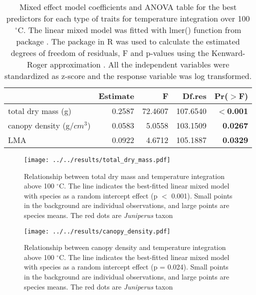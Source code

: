 \documentclass[12pt]{report}
\begin{document}


\begin{table}
\centering
\caption{Mixed effect model coefficients and ANOVA table for the best predictors for each type of traits for temperature integration over 100 $^{\circ}$C. The linear mixed model was fitted with lmer() function from  package \citep{bates2009package}. The  package in R \citep{fox2013hypothesis} was used to calculate the estimated degrees of freedom of residuals, F and p-values using the Kenward-Roger approximation \citep{kenward1997small}. All the independent variables were standardized  as z-score and the response variable was log transformed.}
\vspace{0.5 cm}
\begin{tabular}{lrrrr}
  \hline
 &  Estimate & F  & Df.res & Pr($>$F) \\ 
  \hline 
  total dry mass (g) & 0.2587 & 72.4607  & 107.6540 & \textbf{$<$0.001} \\ 
  canopy density (g/{$cm^3$}) & 0.0583 & 5.0558  & 103.1509 & \textbf{0.0267} \\ 
  LMA & 0.0922 & 4.6712 &  105.1887 & \textbf{0.0329} \\ 
   \hline
\end{tabular}
\label{tab:fandpstatfortemp}
\end{table}


\begin{figure}
    \centering
    \texttt{[image: ../../results/total\_dry\_mass.pdf]}
    \caption[Dry mass effect on temperature integration]{\label{fig:dm-tempint}Relationship between total dry mass and temperature integration above 100 $^{\circ}$C. The line indicates the best-fitted linear mixed model with species as a random intercept effect (p $<$ 0.001). Small points in the background are individual observations, and large points are species means. The red dots are \emph{Juniperus} taxon}
\end{figure}


\begin{figure}
    \centering
    \texttt{[image: ../../results/canopy\_density.pdf]}
    \caption[short version]{\label{fig:canopyden-tempint} Relationship between canopy density and temperature integration above 100 $^{\circ}$C. The line indicates the best-fitted linear mixed model with species as a random intercept effect (p = 0.024). Small points in the background are individual observations, and large points are species means. The red dots are \emph{Juniperus} taxon}
\end{figure}
\end{document}
